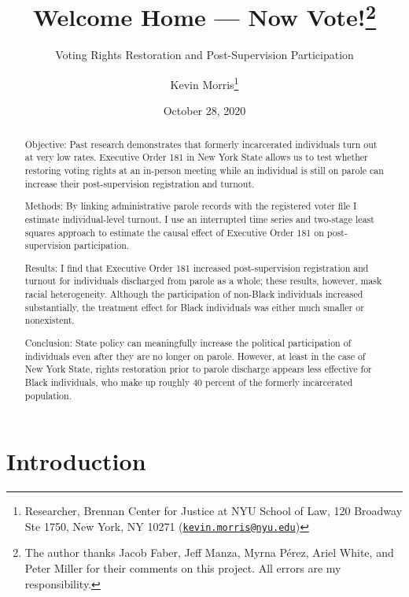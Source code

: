 \documentclass[
  12pt,
]{article}
\title{Welcome Home --- Now Vote!\thanks{The author thanks Jacob Faber, Jeff Manza, Myrna Pérez, Ariel White, and Peter Miller for their comments on this project. All errors are my responsibility.}}
\subtitle{Voting Rights Restoration and Post-Supervision Participation}
\author{Kevin Morris\footnote{Researcher, Brennan Center for Justice at NYU School of Law, 120 Broadway Ste 1750, New York, NY 10271 (\href{mailto:kevin.morris@nyu.edu}{\nolinkurl{kevin.morris@nyu.edu}})}}
\date{October 28, 2020}
\begin{document}
\maketitle
\begin{abstract}
Objective: Past research demonstrates that formerly incarcerated individuals turn out at very low rates. Executive Order 181 in New York State allows us to test whether restoring voting rights at an in-person meeting while an individual is still on parole can increase their post-supervision registration and turnout.

Methods: By linking administrative parole records with the registered voter file I estimate individual-level turnout. I use an interrupted time series and two-stage least squares approach to estimate the causal effect of Executive Order 181 on post-supervision participation.

Results: I find that Executive Order 181 increased post-supervision registration and turnout for individuals discharged from parole as a whole; these results, however, mask racial heterogeneity. Although the participation of non-Black individuals increased substantially, the treatment effect for Black individuals was either much smaller or nonexistent.

Conclusion: State policy can meaningfully increase the political participation of individuals even after they are no longer on parole. However, at least in the case of New York State, rights restoration prior to parole discharge appears less effective for Black individuals, who make up roughly 40 percent of the formerly incarcerated population.
\end{abstract}

\pagebreak
\doublespacing


\hypertarget{introduction}{%
\section*{Introduction}\label{introduction}}
\end{document}

